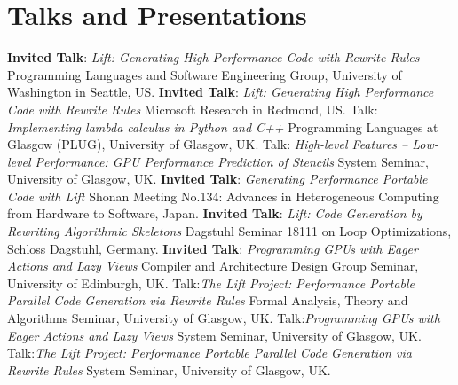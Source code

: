 \documentclass[11pt,a4paper]{moderncv}
\newcommand{\strong}[1]{\textcolor{color1}{\textbf{#1}}}
\begin{document}
\section{Talks and Presentations}
  {\strong{Invited Talk}: \emph{Lift: Generating High Performance Code with Rewrite Rules}\newline
  \small Programming Languages and Software Engineering Group, University of Washington in Seattle, US.}
  {\strong{Invited Talk}: \emph{Lift: Generating High Performance Code with Rewrite Rules}\newline
  \small Microsoft Research in Redmond, US.}
         {Talk: \emph{Implementing lambda calculus in Python and C++}\newline
          \small Programming Languages at Glasgow (PLUG), University of Glasgow, UK.}
         {Talk: \emph{High-level Features – Low-level Performance: GPU Performance Prediction of Stencils}\newline
          \small System Seminar, University of Glasgow, UK.}
         {\strong{Invited Talk}:\newline
          \emph{Generating Performance Portable Code with Lift}\newline
         \small Shonan Meeting No.134: Advances in Heterogeneous Computing from Hardware to Software, Japan.}
         {\strong{Invited Talk}:\newline
          \emph{Lift: Code Generation by Rewriting Algorithmic Skeletons}\newline
         \small Dagstuhl Seminar 18111 on Loop Optimizations, Schloss Dagstuhl, Germany.}
         {\strong{Invited Talk}:\newline
          \emph{Programming GPUs with Eager Actions and Lazy Views}\newline
         \small Compiler and Architecture Design Group Seminar, University of Edinburgh, UK.}
         {Talk:\emph{The Lift Project: Performance Portable Parallel Code Generation via Rewrite Rules}\newline
         \small Formal Analysis, Theory and Algorithms Seminar, University of Glasgow, UK.}
         {Talk:\emph{Programming GPUs with Eager Actions and Lazy Views}\newline
         \small System Seminar, University of Glasgow, UK.}
         {Talk:\emph{The Lift Project: Performance Portable Parallel Code Generation via Rewrite Rules}\newline
         \small System Seminar, University of Glasgow, UK.}
\end{document}
